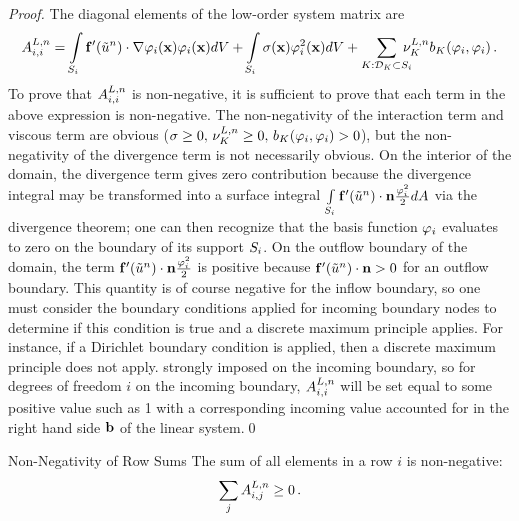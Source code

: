 \begin{proof}
The diagonal elements of the low-order system matrix are
\[
  \ssmatrixletter^{L,\timeindex}_{i,i} =
    \intSi\mathbf{\consfluxletter}'(\approximatescalarsolution^\timeindex)\cdot
    \nabla\testfunction_i(\x)\testfunction_i(\x)d\volume
  + \intSi\sigma(\x)\testfunction_i^2(\x)d\volume
  + \sumKSi\mkern-15mu\lowordercellviscosity[\timeindex]
    \localviscbilinearform{\cell}{i}{i}
  \eqp
\]
To prove that $A^{L,n}_{i,i}$ is non-negative, it is sufficient to
prove that each term in the above expression is non-negative. The
non-negativity of the interaction term and viscous term are obvious
($\reactioncoef \ge 0, \, \lowordercellviscosity[\timeindex]\ge 0, \,
\localviscbilinearform{\cell}{i}{i}>0$), but the non-negativity of the divergence
term is not necessarily obvious. On the interior of the domain, the divergence
term gives zero contribution because the divergence integral may be transformed
into a surface integral
$\int\limits_{S_i}\mathbf{f}'(\tilde{u}^n)
\cdot\mathbf{n}\frac{\varphi_i^2}{2} dA$ via the
divergence theorem; one can then recognize that the basis function
$\varphi_i$ evaluates to zero on the boundary of its support
$S_i$. On the outflow boundary of the domain, the term
$\mathbf{f}'(\tilde{u}^n)
\cdot\mathbf{n} \frac{\varphi_i^2}{2}$ is positive because
$\mathbf{f}'(\tilde{u}^n)
\cdot\mathbf{n} > 0$ for an outflow boundary. This quantity is of
course negative for the inflow boundary, so one must consider the boundary
conditions applied for incoming boundary nodes to determine if this condition
is true and a discrete maximum principle applies. For instance, if a Dirichlet boundary condition is
applied, then a discrete maximum principle does not apply.
strongly imposed on the incoming boundary, so for degrees of freedom $i$ on the
incoming boundary, $A^{L,n}_{i,i}$ will be set equal to some positive
value such as 1 with a corresponding incoming value accounted for in the right
hand side $\ssrhs$ of the linear system.\qed
\end{proof}
\begin{lemma}{Non-Negativity of Row Sums}
   The sum of all elements in a row $i$ is non-negative:
   \[
     \sum\limits_j A^{L,n}_{i,j} \ge 0 \,.
   \]
\end{lemma}

